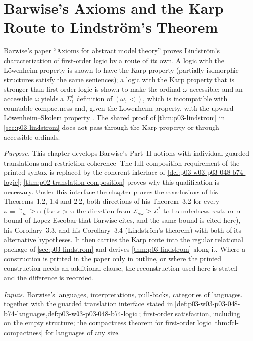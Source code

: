 \chapter{Barwise's Axioms and the Karp Route to Lindstr\"om's Theorem}
\label{sec:p03-w03-p03-048-barwise}

Barwise's paper ``Axioms for abstract model theory'' proves Lindstr\"om's
characterization of first-order logic by a route of its own.  A logic with
the L\"owenheim property is shown to have the Karp property (partially
isomorphic structures satisfy the same sentences); a logic with the Karp
property that is stronger than first-order logic is shown to make the
ordinal \(\omega\) accessible; and an accessible \(\omega\) yields a
\(\Sigma^1_1\) definition of \((\omega,<)\), which is incompatible with
countable compactness and, given the L\"owenheim property, with the upward
L\"owenheim--Skolem property \cite[Part~II, \S\S1--3,
pp.~248--259]{Barwise1974Axioms}.  The shared proof of
\cref{thm:p03-lindstrom} in \cref{sec:p03-lindstrom} does not pass through
the Karp property or through accessible ordinals.

\emph{Purpose.} This chapter develops Barwise's Part~II notions with
individual guarded translations and restriction coherence. The full
composition requirement of the printed syntax is replaced by the
coherent interface of \cref{def:p03-w03-p03-048-b74-logic};
\cref{thm:p02-translation-composition} proves why this qualification is
necessary. Under this interface the chapter proves the conclusions of
his Theorems~1.2, 1.4 and 2.2, both directions
of his Theorem~3.2 for every \(\kappa=\beth_\kappa\geq\omega\) (for
\(\kappa>\omega\) the direction from \(\mathcal L_{\kappa\omega}\geq
\mathcal L^{\ast}\) to boundedness rests on a bound of Lopez-Escobar that
Barwise cites, and the same bound is cited here), his Corollary~3.3, and his
Corollary~3.4 (Lindstr\"om's theorem) with both of its alternative
hypotheses.  It then carries the Karp route into the regular relational
package of \cref{sec:p03-lindstrom} and derives \cref{thm:p03-lindstrom}
along it.  Where a construction is printed in the paper only in outline, or
where the printed construction needs an additional clause, the
reconstruction used here is stated and the difference is recorded.

\emph{Inputs.}  Barwise's languages, interpretations, pull-backs, categories
of languages, together with the guarded translation interface stated in
\cref{def:p03-w03-p03-048-b74-languages,def:p03-w03-p03-048-b74-logic};
first-order satisfaction, including on the empty structure; the compactness
theorem for first-order logic \cref{thm:fol-compactness} for languages of
any size.

